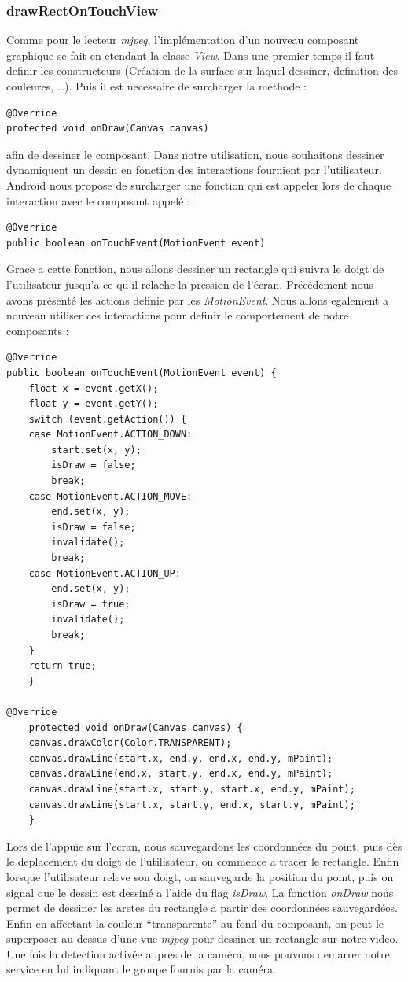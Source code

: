 \subsubsection{drawRectOnTouchView}
Comme pour le lecteur \textit{mjpeg}, l'implémentation d'un nouveau composant
graphique se fait en etendant la classe \textit{View}. Dans une premier temps il
faut definir les constructeurs (Création de la surface sur laquel dessiner,
definition des couleures, \ldots). Puis il est necessaire de surcharger la
methode :
\begin{lstlisting}
@Override
protected void onDraw(Canvas canvas)
\end{lstlisting}
afin de dessiner le composant. Dans notre utilisation, nous souhaitons dessiner
dynamiquent un dessin en fonction des interactions fournient par l'utilisateur.
Android nous propose de surcharger une fonction qui est appeler lors de chaque
interaction avec le composant appelé : 
\begin{lstlisting}
@Override
public boolean onTouchEvent(MotionEvent event)
\end{lstlisting}
Grace a cette fonction, nous allons dessiner un rectangle qui suivra le doigt de
l'utilisateur jusqu'a ce qu'il relache la pression de l'écran.
Précédement nous avons présenté les actions definie par les
\textit{MotionEvent}. Nous allons egalement a nouveau utiliser ces interactions
pour definir le comportement de notre composants :
\begin{lstlisting}[caption={Draw Rectangle Component}] 
@Override
public boolean onTouchEvent(MotionEvent event) {
	float x = event.getX();
	float y = event.getY();
	switch (event.getAction()) {
	case MotionEvent.ACTION_DOWN:
	    start.set(x, y);
	    isDraw = false;
	    break;
	case MotionEvent.ACTION_MOVE:
	    end.set(x, y);
	    isDraw = false;
	    invalidate();
	    break;
	case MotionEvent.ACTION_UP:
	    end.set(x, y);
	    isDraw = true;
	    invalidate();
	    break;
	}
	return true;
    }
    
@Override
    protected void onDraw(Canvas canvas) {
	canvas.drawColor(Color.TRANSPARENT);
	canvas.drawLine(start.x, end.y, end.x, end.y, mPaint);
	canvas.drawLine(end.x, start.y, end.x, end.y, mPaint);
	canvas.drawLine(start.x, start.y, start.x, end.y, mPaint);
	canvas.drawLine(start.x, start.y, end.x, start.y, mPaint);
    }
\end{lstlisting}
Lors de l'appuie sur l'ecran, nous sauvegardons les coordonnées du point, puis
dès le deplacement du doigt de l'utilisateur, on commence a tracer le rectangle.
Enfin lorsque l'utilisateur releve son doigt, on sauvegarde la position du
point, puis on signal que le dessin est dessiné a l'aide du flag
\textit{isDraw}. La fonction \textit{onDraw} nous permet de dessiner les aretes
du rectangle a partir des coordonnées sauvegardées.\newline
\indent Enfin en affectant la couleur ``transparente'' au fond du composant, on
peut le superposer au dessus d'une vue \textit{mjpeg} pour dessiner un rectangle
sur notre video.\newline
\newline\indent Une fois la detection activée aupres de la caméra, nous pouvons
demarrer notre service en lui indiquant le groupe fournis par la caméra.

